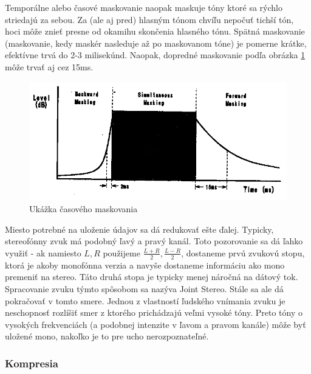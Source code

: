 Temporálne alebo časové maskovanie naopak maskuje tóny ktoré sa rýchlo
striedajú za sebou. Za (ale aj pred) hlasným tónom chvíľu nepočuť
tichší tón, hoci môže znieť presne od okamihu skončenia hlasného tónu.
Spätná maskovanie (maskovanie, kedy maskér nasleduje až po maskovanom
tóne) je pomerne krátke, efektívne trvá do 2-3 milisekúnd.
Naopak, dopredné maskovanie podľa obrázka \ref{fig:temporal_masking}
môže trvať aj cez 15ms.

\begin{figure}[htp]
    \centering
    \includegraphics{obrazky/informatika/audio/temporal_masking}
    \caption{Ukážka časového maskovania}
    \label{fig:temporal_masking}
\end{figure}

Miesto potrebné na uloženie údajov sa dá redukovať ešte ďalej.
Typicky, stereofónny zvuk má podobný ľavý a pravý kanál. Toto
pozorovanie sa dá ľahko využiť - ak namiesto $L,R$ použijeme
$\frac{L+R}{2}, \frac{L-R}{2}$, dostaneme prvú zvukovú stopu, ktorá je
akoby monofónna verzia a navyše dostaneme informáciu ako mono premeniť
na stereo. Táto druhá stopa je typicky menej náročná na dátový tok.
Spracovanie zvuku týmto spôsobom sa nazýva Joint Stereo.
Stále sa ale dá pokračovať v tomto smere. Jednou z vlastností ľudského
vnímania zvuku je neschopnosť rozlíšiť smer z ktorého prichádzajú
veľmi vysoké tóny. Preto tóny o vysokých frekvenciách (a podobnej
intenzite v ľavom a pravom kanále) môže byť uložené mono, nakoľko je
to pre ucho nerozpoznateľné.

\subsubsection{Kompresia}
